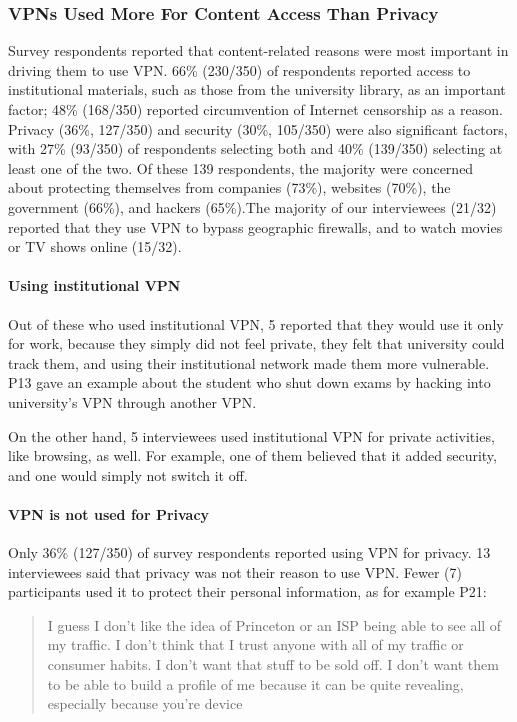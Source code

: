 \subsubsection{VPNs Used More For Content Access Than Privacy}
Survey respondents reported that content-related reasons were most important
in driving them to use VPN. 66\% (230/350) of respondents reported access to
institutional materials, such as those from the university library, as an
important factor; 48\% (168/350) reported circumvention of Internet censorship
as a reason. Privacy (36\%, 127/350) and security (30\%, 105/350) were also
significant factors, with 27\% (93/350) of respondents selecting both and 40\%
(139/350) selecting at least one of the two. Of these 139 respondents, the
majority were concerned about protecting themselves from companies (73\%),
websites (70\%), the government (66\%), and hackers (65\%).The majority of our interviewees (21/32) reported
that they use VPN to bypass geographic firewalls, and to watch movies
or TV shows online (15/32).  

\paragraph{Using institutional VPN} Out of these who used institutional
VPN, 5 reported that they would use it only for work, because they simply did
not feel private, they felt that university could track them, and using their
institutional network made them more vulnerable. P13 gave an example about the
student who shut down exams by hacking into university's VPN through another
VPN. %

On the other hand, 5 interviewees used institutional VPN for private
activities, like browsing, as well. For example, one of them believed that it
added security, and one would simply not switch it off. 

\paragraph{VPN is not used for Privacy} Only 36\% (127/350) of survey respondents reported using VPN for privacy. 13 interviewees said that privacy was not
their reason to use VPN. Fewer (7) participants used it to protect their
personal information, as for example P21: \begin{quote}I guess I don't like
the idea of Princeton or an ISP being able to see all of my traffic. I don't
think that I trust anyone with all of my traffic or consumer habits. I don't
want that stuff to be sold off. I don't want them to be able to build a
profile of me because it can be quite revealing, especially because you're
device\end{quote}


